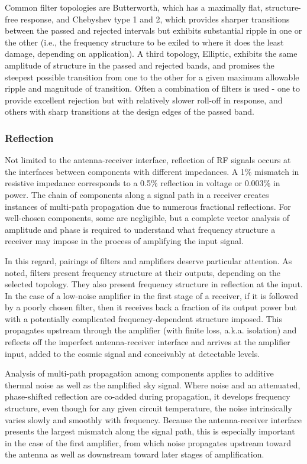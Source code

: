  Common filter topologies are Butterworth, which has a maximally flat, structure-free response, and Chebyshev type 1 and 2, which provides sharper transitions between the passed and rejected intervals but exhibits substantial ripple in one or the other (i.e., the frequency structure to be exiled to where it does the least damage, depending on application).  A third topology, Elliptic, exhibits the same amplitude of structure in the passed and rejected bands, and promises the steepest possible transition from one to the other for a given maximum allowable ripple and magnitude of transition.  Often a combination of filters is used - one to provide excellent rejection but with relatively slower roll-off in response, and others with sharp transitions at the design edges of the passed band.  
   
\subsubsection{Reflection}

Not limited to the antenna-receiver interface, reflection of RF signals occurs at the interfaces between components with different impedances.  A 1\% mismatch in resistive impedance corresponds to a 0.5\% reflection in voltage or 0.003\% in power.  The chain of components along a signal path in a receiver creates instances of multi-path propagation due to numerous fractional reflections.  For well-chosen components, some are negligible, but a complete vector analysis of amplitude and phase is required to understand what frequency structure a receiver may impose in the process of amplifying the input signal.  

In this regard, pairings of filters and amplifiers deserve particular attention.  As noted, filters present frequency structure at their outputs, depending on the selected topology.  They also present frequency structure in reflection at the input. In the case of a low-noise amplifier in the first stage of a receiver, if it is followed by a poorly chosen filter, then it receives back a fraction of its output power but with a potentially complicated frequency-dependent structure imposed.  This propagates upstream through the amplifier (with finite loss, a.k.a. isolation) and reflects off the imperfect antenna-receiver interface and arrives at the amplifier input, added to the cosmic signal and conceivably at detectable levels.

Analysis of multi-path propagation among components applies to additive  thermal noise as well as the amplified sky signal.  Where noise and an attenuated, phase-shifted reflection are co-added during propagation, it develops frequency structure, even though for any given circuit temperature, the noise intrinsically varies slowly and smoothly with frequency.  Because the antenna-receiver interface presents the largest mismatch along the signal path, this is especially important in the case of the first amplifier, from which noise propagates upstream toward the antenna as well as downstream toward later stages of amplification.


